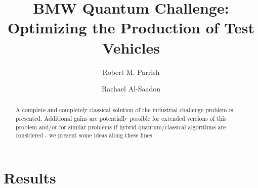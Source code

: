 \documentclass[aps,pra,twocolumn,superscriptaddress,groupedaddress]{revtex4}  %
\begin{document}

\title{
BMW Quantum Challenge: Optimizing the Production of Test Vehicles
}

\author{Robert M. Parrish}
\author{Rachael Al-Saadon}


\begin{abstract} 
A complete and completely classical solution of the industrial challenge problem
is presented.  Additional gains are potentially possible for extended versions
of this problem and/or for similar problems if hybrid quantum/classical
algorithms are considered - we present some ideas along these lines.

\end{abstract}

\maketitle

\section{Results}
\end{document}
